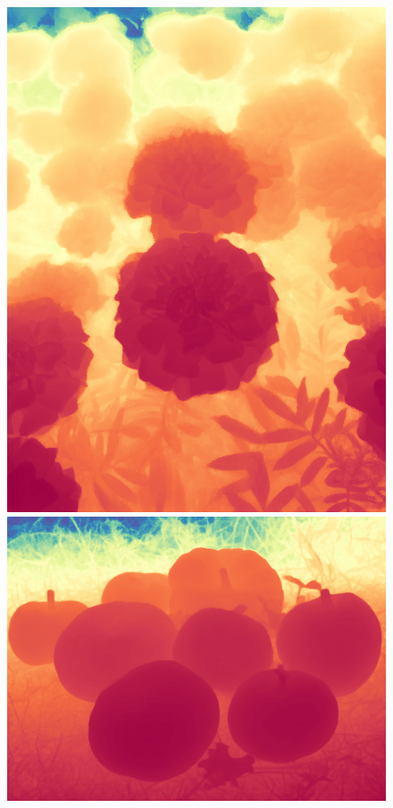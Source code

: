 \documentclass[12pt, letterpaper]{article}
\begin{document}
\begin{figure}[!ht]
\begin{minipage}{0.22\textwidth}
    \end{minipage}
    \begin{minipage}{0.22\textwidth}
        \includegraphics[width=\textwidth]{example_0_pred_colored}
        \includegraphics[width=\textwidth]{example_2_pred_colored}

\end{minipage}
\end{figure}
\end{document}
